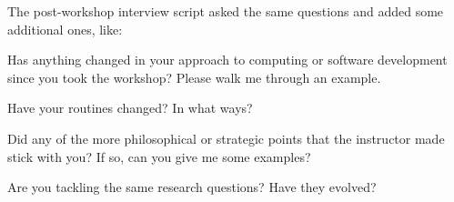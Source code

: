 \documentclass{proposalnsf}
\begin{document}
The post-workshop interview script asked the same questions and added
some additional ones, like:

\begin{compactitem}
\item Has anything changed in your approach to computing or software development since you took the workshop? Please walk me through an example.

\item Have your routines changed? In what ways?

\item Did any of the more philosophical or strategic points that the instructor made stick with you? If so, can you give me some examples?

\item Are you tackling the same research questions? Have they evolved?
\end{compactitem}

\appendix

\newpage
{}
\renewcommand{\thepage} {\footnotesize References\,---\,\arabic{page}}




\end{document}
